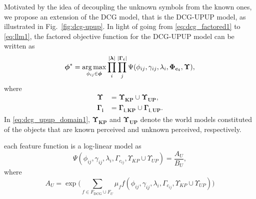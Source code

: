 Motivated by the idea of decoupling the unknown symbols from the known ones, we propose an extension of the DCG model, that is the DCG-UPUP model, as illustrated in Fig.~\ref{fig:dcg-upup}. In light of going from \eqref{eq:dcg_factored1} to \eqref{eq:llm1}, the factored objective function for the DCG-UPUP model can be written as %
\begin{equation}
\boldsymbol{\phi}^* = \operatorname*{\arg\max}_{\phi_{ij} \in \boldsymbol{\phi}} \prod_{i}^{|\boldsymbol\lambda|} \prod_{j}^{|\boldsymbol{\Gamma_i}|} \Psi(\phi_{ij},\gamma_{ij},\lambda_i,\boldsymbol{\Phi_{c_{i}}},\boldsymbol\Upsilon),
\label{eq:dcg_upup_llm1}
\end{equation}
where 
\begin{eqnarray}
\boldsymbol\Upsilon &= \boldsymbol{\Upsilon_{KP}} \cup \boldsymbol{\Upsilon_{UP}}, \label{eq:dcg_upup_domain1} \\
\boldsymbol{\Gamma_i} &= \boldsymbol{\Gamma_{i,KP}} \cup \boldsymbol{\Gamma_{i,UP}.} 
\label{eq:dcg_upup_domain2}
\end{eqnarray}
In \eqref{eq:dcg_upup_domain1}, $\boldsymbol{\Upsilon_{KP}}$ and $\boldsymbol{\Upsilon_{UP}}$ denote the world models constituted of the objects that are known perceived and unknown perceived, respectively. %

each feature function is a log-linear model as
\begin{equation}
\Psi(\phi_{ij},\gamma_{ij},\lambda_i,\Gamma_{c_{ij}},\Upsilon_{KP} \cup \Upsilon_{UP}) = \frac{A_U}{B_U},
\label{eq:dcg_upup_llm2}
\end{equation}
where
\begin{equation}
A_U= \exp \Big( \sum_{f \in F_{\text{DCG}} \cup F_U} \mu_f f(\phi_{ij},\gamma_{ij},\lambda_i,\Gamma_{c_{ij}},\Upsilon_{KP} \cup \Upsilon_{UP}) \Big) \nonumber
\end{equation}

